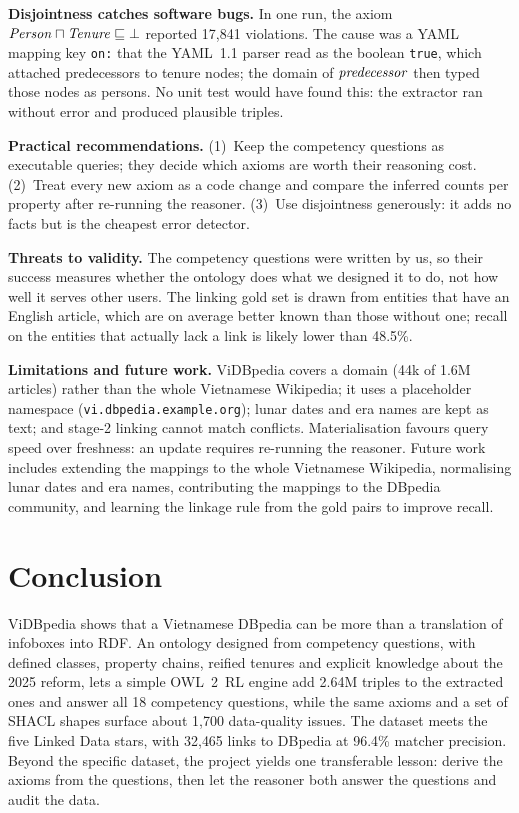 \documentclass{article}
\newcommand{\cls}[1]{\ensuremath{\text{\textit{#1}}}}  %
\newcommand{\ttl}[1]{\texttt{#1}}          %
\begin{document}
\textbf{Disjointness catches software bugs.} In one run, the axiom $\cls{Person} \sqcap \cls{Tenure} \sqsubseteq \bot$
reported 17{,}841 violations. The cause was a YAML mapping key \ttl{on:} that the YAML~1.1 parser read as the boolean
\ttl{true}, which attached predecessors to tenure nodes; the domain of \cls{predecessor} then typed those nodes as
persons. No unit test would have found this: the extractor ran without error and produced plausible triples.

\textbf{Practical recommendations.} (1)~Keep the competency questions as executable queries; they decide which
axioms are worth their reasoning cost. (2)~Treat every new axiom as a code change and compare the inferred counts per
property after re-running the reasoner. (3)~Use disjointness generously: it adds no facts but is the cheapest error detector.

\textbf{Threats to validity.} The competency questions were written by us, so their success measures whether the
ontology does what we designed it to do, not how well it serves other users. The linking gold set is drawn from
entities that have an English article, which are on average better known than those without one; recall on the
entities that actually lack a link is likely lower than 48.5\%.

\textbf{Limitations and future work.} ViDBpedia covers a domain (44k of 1.6M articles) rather than the whole Vietnamese
Wikipedia; it uses a placeholder namespace (\ttl{vi.dbpedia.example.org}); lunar dates and era names are kept as
text; and stage-2 linking cannot match conflicts. Materialisation favours query speed over freshness: an update requires
re-running the reasoner. Future work includes extending the mappings to the whole Vietnamese Wikipedia, normalising
lunar dates and era names, contributing the mappings to the DBpedia community, and learning the linkage rule from the
gold pairs to improve recall.

\section{Conclusion}

ViDBpedia shows that a Vietnamese DBpedia can be more than a translation of infoboxes into RDF. An ontology designed
from competency questions, with defined classes, property chains, reified tenures and explicit knowledge about the 2025
reform, lets a simple OWL~2~RL engine add 2.64M triples to the extracted ones and answer all 18 competency questions,
while the same axioms and a set of SHACL shapes surface about 1{,}700 data-quality issues. The dataset meets the five
Linked Data stars, with 32{,}465 links to DBpedia at 96.4\% matcher precision. Beyond the specific dataset, the project
yields one transferable lesson: derive the axioms from the questions, then let the reasoner both answer the questions
and audit the data.
\end{document}
